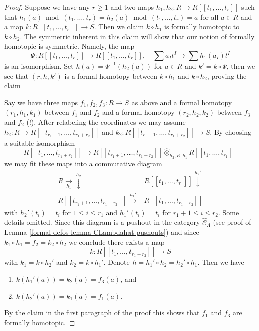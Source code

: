 \begin{proof}
Suppose we have any $r \geq 1$ and two maps
$h_1, h_2 : R \to R[[t_1, \ldots, t_r]]$ such that
$h_1(a) \bmod (t_1, \ldots, t_r) =  h_2(a) \bmod (t_1, \ldots, t_r) = a$
for all $a \in R$ and a map $k : R[[t_1, \ldots, t_r]] \to S$.
Then we claim $k \circ h_1$ is formally homotopic to $k \circ h_2$.
The symmetric inherent in this claim will show that our notion
of formally homotopic is symmetric. Namely, the map
$$
\Psi :
R[[t_1, \ldots, t_r]]
\longrightarrow
R[[t_1, \ldots, t_r]],\quad
\sum a_I t^I \longmapsto \sum h_1(a_I)t^I
$$
is an isomorphism. Set $h(a) = \Psi^{-1}(h_2(a))$ for $a \in R$ and
$k' = k \circ \Psi$, then we see that $(r, h, k')$ is a formal
homotopy between $k \circ h_1$ and $k \circ h_2$, proving the claim

\medskip\noindent
Say we have three maps $f_1, f_2, f_3 : R \to S$ as above
and a formal homotopy $(r_1, h_1, k_1)$ between $f_1$ and $f_2$
and a formal homotopy $(r_2, h_2, k_2)$ between $f_3$ and $f_2$ (!).
After relabeling the coordinates we may assume
$h_2 : R \to R[[t_{r_1 + 1}, \ldots, t_{r_1 + r_2}]]$
and
$k_2 : R[[t_{r_1 + 1}, \ldots, t_{r_1 + r_2}]] \to S$.
By choosing a suitable isomorphism
$$
R[[t_1, \ldots, t_{r_1 + r_2}]]
\longrightarrow
R[[t_{r_1 + 1}, \ldots, t_{r_1 + r_2}]]
\widehat{\otimes}_{h_2, R, h_1}
R[[t_1, \ldots, t_{r_1}]]
$$
we may fit these maps into a commutative diagram
$$
\begin{array}{cc}R \underset{h_1}{\longrightarrow}\overset{h_2}{\downarrow} & R[[t_1, \ldots, t_{r_1}]] \overset{h_2'}{\downarrow} \\ R[[t_{r_1 + 1}, \ldots, t_{r_1 + r_2}]] \overset{h_1'}{\longrightarrow} & R[[t_1, \ldots, t_{r_1 + r_2}]]\end{array}
$$
with $h_2'(t_i) = t_i$ for $1 \leq i \leq r_1$ and
$h_1'(t_i) = t_i$ for $r_1 + 1 \leq i \leq r_2$.
Some details omitted.
Since this diagram is a pushout in the category
$\widehat{\mathcal{C}}_\Lambda$ (see proof of
Lemma \ref{formal-defos-lemma-CLambdahat-pushouts})
and since $k_1 \circ h_1 = f_2 = k_2 \circ h_2$ we conclude
there exists a map
$$
k : R[[t_1, \ldots, t_{r_1 + r_2}]] \to S
$$
with $k_1 = k \circ h_2'$ and $k_2 = k \circ h_1'$.
Denote $h = h_1' \circ h_2 = h_2' \circ h_1$.
Then we have
\begin{enumerate}
\item $k(h_1'(a)) = k_2(a) = f_3(a)$, and
\item $k(h_2'(a)) = k_1(a) = f_1(a)$.
\end{enumerate}
By the claim in the first paragraph of the proof this shows that
$f_1$ and $f_3$ are formally homotopic.
\end{proof}

